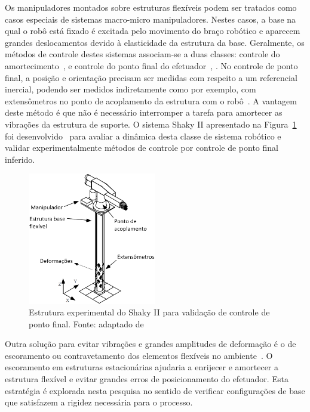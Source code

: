 Os manipuladores montados sobre estruturas flexíveis podem ser tratados como
casos especiais de sistemas macro-micro manipuladores. Nestes casos, a base na
qual o robô está fixado é excitada pelo movimento do braço robótico e aparecem
grandes deslocamentos devido à elasticidade da estrutura da base.
Geralmente, os métodos de controle destes sistemas associam-se a duas classes:
controle do amortecimento~\cite{george2002inertial}, \cite{lew2001simple} e
controle do ponto final do efetuador~\cite{sharon1993macro},
\cite{torres1993path}. No controle de ponto final, a posição e orientação
precisam ser medidas com respeito a um referencial inercial, podendo ser medidos
indiretamente como por exemplo, com extensômetros no ponto de acoplamento da
estrutura com o robô~\cite{mavroidis1997optimal}.
A vantagem deste método é que não é necessário interromper a tarefa para
amortecer as vibrações da estrutura de suporte. O sistema Shaky II apresentado
na Figura~\ref{fig::shaky} foi desenvolvido~\cite{mavroidis1997optimal}
para avaliar a dinâmica desta classe de sistema robótico e validar
experimentalmente métodos de controle por controle de ponto final inferido.

\begin{figure}[h]
	\centering 
 	\includegraphics[width=0.50\textwidth]{figs/shaky}
 	\caption[Estrutura experimental do Shaky II]{Estrutura experimental do Shaky II para validação de
 	controle de ponto final. Fonte: adaptado de \cite{mavroidis1997optimal}}
 	\label{fig::shaky}
\end{figure}

Outra solução para evitar vibrações e grandes amplitudes de deformação é o
de escoramento ou contravetamento dos elementos flexíveis no
ambiente~\cite{lew1994bracing}. O escoramento em estruturas estacionárias
ajudaria a enrijecer e amortecer a estrutura flexível e evitar grandes erros de
posicionamento do efetuador. Esta estratégia é explorada nesta pesquisa no
sentido de verificar configurações de base que satisfazem a rigidez necessária para o
processo.

